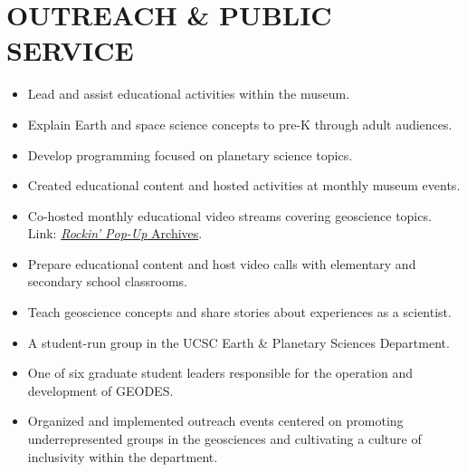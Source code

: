 \section*{OUTREACH \& PUBLIC SERVICE}

\begin{itemize}
\item Lead and assist educational activities within the museum.
\item Explain Earth and space science concepts to pre-K through adult audiences.
\item Develop programming focused on planetary science topics.
\end{itemize}

\begin{itemize}
	\item Created educational content and hosted activities at monthly museum events.
	\item Co-hosted monthly educational video streams covering geoscience topics. \\
	Link: \href{https://www.santacruzmuseum.org/category/rockin-pop-up/}{\emph{Rockin' Pop-Up} Archives}.
\end{itemize}

\begin{itemize}
	\item Prepare educational content and host video calls with elementary and secondary school classrooms.
	\item Teach geoscience concepts and share stories about experiences as a scientist.
\end{itemize}

\begin{itemize}
	\item A student-run group in the UCSC Earth \& Planetary Sciences Department.
	\item One of six graduate student leaders responsible for the operation and development of GEODES.
	\item Organized and implemented outreach events centered on promoting underrepresented groups in the geosciences and cultivating a culture of inclusivity within the department.
\end{itemize}

